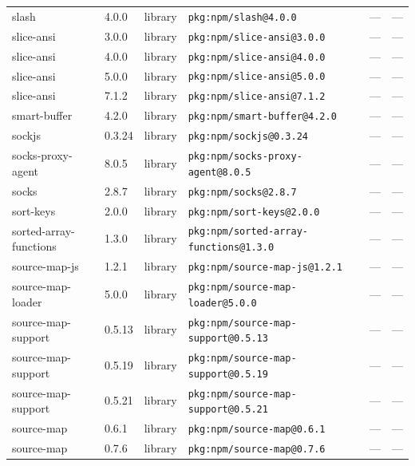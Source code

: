 \documentclass[11pt,a4paper]{article}
\begin{document}
\begin{longtable}{|p{4cm}|p{2cm}|p{1.6cm}|p{5cm}|p{1.5cm}|p{3.5cm}|}
\raggedright slash & 4.0.0 & library & \small\texttt{pkg:npm/slash@4.0.0} & — & \small — \\
\raggedright slice-ansi & 3.0.0 & library & \small\texttt{pkg:npm/slice-ansi@3.0.0} & — & \small — \\
\raggedright slice-ansi & 4.0.0 & library & \small\texttt{pkg:npm/slice-ansi@4.0.0} & — & \small — \\
\raggedright slice-ansi & 5.0.0 & library & \small\texttt{pkg:npm/slice-ansi@5.0.0} & — & \small — \\
\raggedright slice-ansi & 7.1.2 & library & \small\texttt{pkg:npm/slice-ansi@7.1.2} & — & \small — \\
\raggedright smart-buffer & 4.2.0 & library & \small\texttt{pkg:npm/smart-buffer@4.2.0} & — & \small — \\
\raggedright sockjs & 0.3.24 & library & \small\texttt{pkg:npm/sockjs@0.3.24} & — & \small — \\
\raggedright socks-proxy-agent & 8.0.5 & library & \small\texttt{pkg:npm/socks-proxy-agent@8.0.5} & — & \small — \\
\raggedright socks & 2.8.7 & library & \small\texttt{pkg:npm/socks@2.8.7} & — & \small — \\
\raggedright sort-keys & 2.0.0 & library & \small\texttt{pkg:npm/sort-keys@2.0.0} & — & \small — \\
\raggedright sorted-array-functions & 1.3.0 & library & \small\texttt{pkg:npm/sorted-array-functions@1.3.0} & — & \small — \\
\raggedright source-map-js & 1.2.1 & library & \small\texttt{pkg:npm/source-map-js@1.2.1} & — & \small — \\
\raggedright source-map-loader & 5.0.0 & library & \small\texttt{pkg:npm/source-map-loader@5.0.0} & — & \small — \\
\raggedright source-map-support & 0.5.13 & library & \small\texttt{pkg:npm/source-map-support@0.5.13} & — & \small — \\
\raggedright source-map-support & 0.5.19 & library & \small\texttt{pkg:npm/source-map-support@0.5.19} & — & \small — \\
\raggedright source-map-support & 0.5.21 & library & \small\texttt{pkg:npm/source-map-support@0.5.21} & — & \small — \\
\raggedright source-map & 0.6.1 & library & \small\texttt{pkg:npm/source-map@0.6.1} & — & \small — \\
\raggedright source-map & 0.7.6 & library & \small\texttt{pkg:npm/source-map@0.7.6} & — & \small — \\

\end{longtable}
\end{document}

